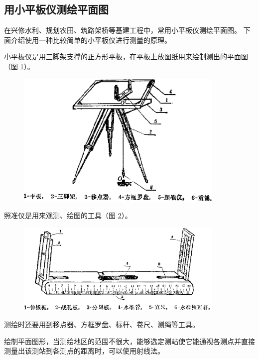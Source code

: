 \subsection{用小平板仪测绘平面图}\label{subsec:czjh2-6-12}
\begin{enhancedline}

在兴修水利、规划农田、筑路架桥等基建工程中，常用小平板仪测绘平面图。
下面介绍使用一种比较简单的小平板仪进行测量的原理。

小平板仪是用三脚架支撑的正方形平板，在平板上放图纸用来绘制测出的平面图（图 \ref{fig:czjh2-6-44}）。

\begin{figure}[htbp]
    \centering
    \includegraphics[width=10cm]{../pic/czjh2-ch6-44.png}
    \caption{}\label{fig:czjh2-6-44}
\end{figure}

照准仪是用来观测、绘图的工具（图 \ref{fig:czjh2-6-45}）。

\begin{figure}[htbp]
    \centering
    \includegraphics[width=10cm]{../pic/czjh2-ch6-45.png}
    \caption{}\label{fig:czjh2-6-45}
\end{figure}


测绘时还要用到移点器、方框罗盘、标杆、卷尺、测绳等工具。

绘制平面图形，当测绘地区的范围不很大，能够选定测站使它能通视各测点并直接测量出该测站到各测点的距离时，可以使用射线法。


\end{enhancedline}
